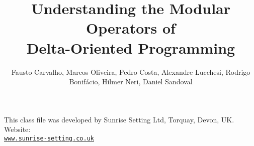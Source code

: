 \documentclass[times]{speauth}
\begin{document}
\title{Understanding the Modular Operators of \\ Delta-Oriented Programming}

\author{Fausto Carvalho,  Marcos Oliveira, Pedro Costa, Alexandre Lucchesi, Rodrigo Bonif\'{a}cio, Hilmer Neri, Daniel Sandoval}

\address{Computar Science Department, University of Bras\'{i}lia,
  Bras\'{i}lia, Brazil \break
  Faculty of Engineering of Gama, University of Bras\'{i}lia,
  Bras\'{i}lia, Brazil}




\maketitle










\ack This class file was developed by Sunrise Setting Ltd,
Torquay, Devon, UK. Website:\\
\href{http://www.sunrise-setting.co.uk}{\texttt{www.sunrise-setting.co.uk}}



\end{document}
